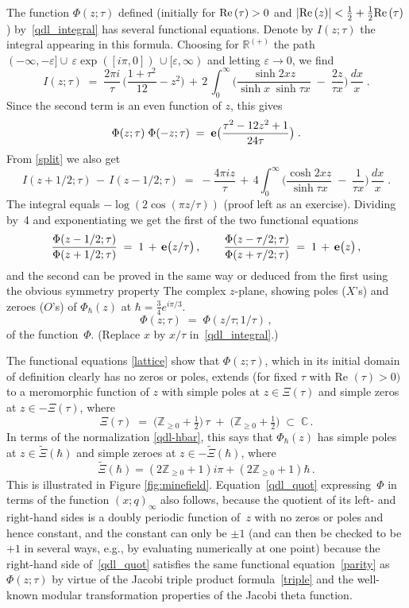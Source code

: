 \documentclass[hyper]{JHEP3}
\renewcommand{\Re}{{\rm Re}\,}
\def\re{\mbox{Re }}
\newcommand{\C}{{\mathbb{C}}}
\newcommand{\Z}{{\mathbb{Z}}}
\newcommand\be{\begin{equation}}
\newcommand\ee{\end{equation}}
\def\={\;=\;}
\def\t{\tau}
\def\ve{\varepsilon}
\def\e{\bold e}
\def\Rp{\mathbb R^{(+)}}
\begin{document}
\smallskip{} The function $\Phi(z;\t)$ defined (initially for $\Re(\t)>0$
and $|\Re(z)|<\frac12+\frac12\Re(\t)$) by~\eqref{qdl_integral} has several functional equations.
Denote by $I(z;\t)$ the integral appearing in this formula. Choosing for $\Rp$ the path
$(-\infty,-\ve]\cup\,\ve\exp([i\pi,0])\,\cup[\ve,\infty)$ and letting $\ve\to0$, we find
  \be\label{split} I(z;\t)\=\frac{2\pi i}\t\,\biggl(\frac{1+\t^2}{12}-z^2\biggr)
    \,+\,2\,\int_0^\infty\biggl(\frac{\sinh 2xz}{\sinh x\;\sinh\t x}\;-\;\frac{2z}{\t x}\biggr)\,\frac{dx}x\;. \ee
Since the second term is an even function of $z$, this gives
   \be\label{parity} \Phi(z;\t)\;\Phi(-z;\t)\=\e\bigl(\frac{\t^2-12z^2+1}{24\t}\bigr)\;. \ee
From \eqref{split} we also get
  \be I(z+1/2;\t)\,-\,I(z-1/2;\t)\=-\frac{4\pi iz}\t\,+\,4\int_0^\infty
    \biggl(\frac{\cosh 2xz}{\sinh\t x}\;-\;\frac1{\t x}\biggr)\,\frac{dx}x\;. \ee
The integral equals $-\log(2\cos(\pi z/\t))$ (proof left as an exercise).
Dividing by~4 and exponentiating we get the first of the two functional equations
 \be\label{lattice}\frac{\Phi(z-1/2;\t)}{\Phi(z+1/2;\t)}\=1\,+\,\e\bigl(z/\t\bigr)\,,
  \qquad\frac{\Phi(z-\t/2;\t)}{\Phi(z+\t/2;\t)}\=1\,+\,\e\bigl(z\bigr)\,,\ee
and the second can be proved in the same way or deduced from the first using the obvious symmetry property
%
{The complex $z$-plane, showing poles ($X$'s) and zeroes ($O$'s) of $\Phi_\hbar(z)$ at $\hbar=\frac{3}{4}e^{i\pi/3}$.\\
\label{fig:minefield} }
  \be\label{scaling} \Phi(z;\t)\=\Phi(z/\t;1/\t)\,, \ee
of the function~$\Phi$. (Replace $x$ by $x/\t$ in~\eqref{qdl_integral}.)




\smallskip{}  The functional equations \eqref{lattice} show that $\Phi(z;\t)$, which in its
initial domain of definition clearly has no zeros or poles, extends (for fixed $\t$ with $\re(\t)>0)$ to a
meromorphic function of $z$ with simple poles at $z\in\Xi(\t)$ and simple zeros at $z\in-\Xi(\t)$, where
%
\be\label{poles} \Xi(\t)\=\bigl(\Z_{\ge0}+\tfrac12\bigr)\,\t\;+\;\bigl(\Z_{\ge0}+\tfrac12\bigr)\;\subset\;\C\,.\ee
%
In terms of the normalization \eqref{qdl-hbar}, this says that $\Phi_\hbar(z)$ has simple poles at $z\in\tilde{\Xi}(\hbar)$ and simple zeroes at $z\in-\tilde{\Xi}(\hbar)$, where
%
\be \label{polesh} \tilde{\Xi}(\hbar) = (2\Z_{\ge0}+1)i\pi+(2\Z_{\ge0}+1)\hbar\,. \ee
%
This is illustrated in Figure \ref{fig:minefield}. Equation~\eqref{qdl_quot} expressing~$\Phi$ in terms of the function $(x;q)_\infty$ also follows, because
the quotient of its left- and right-hand sides is a doubly periodic function of~$z$ with no zeros or poles
and hence constant, and the constant can only be $\pm1$ (and can then be checked to be $+1$ in several ways,
e.g., by evaluating numerically at one point) because the right-hand side of~\eqref{qdl_quot} satisfies
the same functional equation~\eqref{parity} as $\Phi(z;\t)$ by virtue of the Jacobi triple product
formula~\eqref{triple} and the well-known modular transformation properties of the Jacobi theta function.
\end{document}
